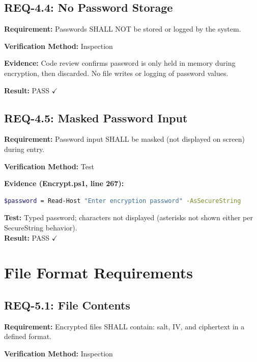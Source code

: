 \documentclass[11pt,letterpaper]{article}
\begin{document}
\subsection{REQ-4.4: No Password Storage}

\textbf{Requirement:} Passwords SHALL NOT be stored or logged by the system.

\textbf{Verification Method:} Inspection

\textbf{Evidence:} Code review confirms password is only held in memory during encryption, then discarded. No file writes or logging of password values.

\textbf{Result:} PASS $\checkmark$

\subsection{REQ-4.5: Masked Password Input}

\textbf{Requirement:} Password input SHALL be masked (not displayed on screen) during entry.

\textbf{Verification Method:} Test

\begin{samepage}
\textbf{Evidence (Encrypt.ps1, line 267):}
\begin{lstlisting}[language=bash]
$password = Read-Host "Enter encryption password" -AsSecureString
\end{lstlisting}
\textbf{Test:} Typed password; characters not displayed (asterisks not shown either per SecureString behavior).\\
\textbf{Result:} PASS $\checkmark$
\end{samepage}

\newpage
\section{File Format Requirements}

\subsection{REQ-5.1: File Contents}

\textbf{Requirement:} Encrypted files SHALL contain: salt, IV, and ciphertext in a defined format.

\textbf{Verification Method:} Inspection
\end{document}
